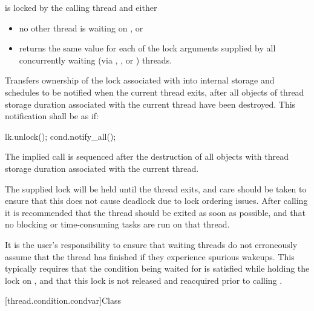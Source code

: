 \begin{itemdescr}
\pnum
\requires {} is locked by the calling thread and either
\begin{itemize}
\item no other thread is waiting on , or
\item {} returns the same value for each of the lock arguments
supplied by all concurrently waiting (via , ,
or ) threads.
\end{itemize}

\pnum
\effects
Transfers ownership of the lock associated with  into
internal storage and schedules  to be notified when the current
thread exits, after all objects of thread storage duration associated with
the current thread have been destroyed. This notification shall be as if:
\begin{codeblock}
lk.unlock();
cond.notify_all();
\end{codeblock}

\pnum
\sync
The implied  call is sequenced after the destruction of
all objects with thread storage duration associated with the current thread.

\pnum
\begin{note}
The supplied lock will be held until the thread exits, and care
should be taken to ensure that this does not cause deadlock due to lock
ordering issues. After calling  it is
recommended that the thread should be exited as soon as possible, and
that no blocking or time-consuming tasks are run on that thread.
\end{note}

\pnum
\begin{note}
It is the user's responsibility to ensure that waiting threads
do not erroneously assume that the thread has finished if they experience
spurious wakeups. This typically requires that the condition being waited
for is satisfied while holding the lock on , and that this lock
is not released and reacquired prior to calling .
\end{note}
\end{itemdescr}

[thread.condition.condvar]{Class }

